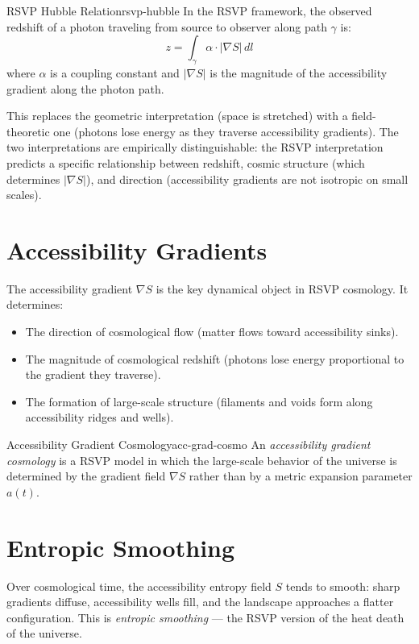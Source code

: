 \begin{definition}{RSVP Hubble Relation}{rsvp-hubble}
  In the RSVP framework, the observed redshift of a photon traveling
  from source to observer along path $\gamma$ is:
  \[
    z = \int_\gamma \alpha \cdot |\nabla S| \,dl
  \]
  where $\alpha$ is a coupling constant and $|\nabla S|$ is the magnitude
  of the accessibility gradient along the photon path.
\end{definition}

This replaces the geometric interpretation (space is stretched) with a
field-theoretic one (photons lose energy as they traverse accessibility
gradients). The two interpretations are empirically distinguishable:
the RSVP interpretation predicts a specific relationship between redshift,
cosmic structure (which determines $|\nabla S|$), and direction (accessibility
gradients are not isotropic on small scales).

\section{Accessibility Gradients}

The accessibility gradient $\nabla S$ is the key dynamical object
in RSVP cosmology. It determines:

\begin{itemize}
  \item The direction of cosmological flow (matter flows toward
        accessibility sinks).
  \item The magnitude of cosmological redshift (photons lose energy
        proportional to the gradient they traverse).
  \item The formation of large-scale structure (filaments and voids
        form along accessibility ridges and wells).
\end{itemize}

\begin{definition}{Accessibility Gradient Cosmology}{acc-grad-cosmo}
  An \emph{accessibility gradient cosmology} is a RSVP model in which
  the large-scale behavior of the universe is determined by the gradient
  field $\nabla S$ rather than by a metric expansion parameter $a(t)$.
\end{definition}

\section{Entropic Smoothing}

Over cosmological time, the accessibility entropy field $S$ tends to
smooth: sharp gradients diffuse, accessibility wells fill, and the
landscape approaches a flatter configuration. This is \emph{entropic
smoothing} — the RSVP version of the heat death of the universe.

